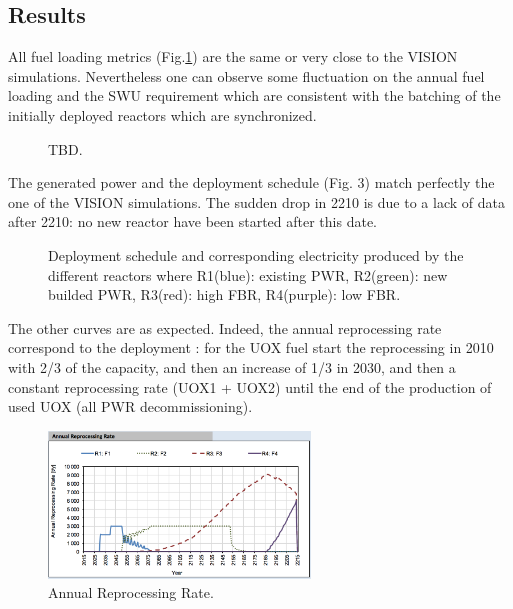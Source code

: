 \documentclass[12pt]{article}
\begin{document}
\subsection{Results}
All fuel loading metrics (Fig.\ref{fig:RessourceUsed}) are the same or very close to the VISION simulations. Nevertheless one can observe some fluctuation on the annual fuel loading and the SWU requirement which are consistent with the batching of the initially deployed reactors which are synchronized.

\begin{figure}[h!]
\centering
{}
\caption{TBD.\label{fig:RessourceUsed} }
\end{figure}

The generated power and the deployment schedule (Fig. 3)  match perfectly the one of the VISION simulations. The sudden drop in 2210 is due to a lack of data after 2210: no new reactor have been started after this date.\\

\begin{figure}[h!]
\centering
{}
\caption{Deployment schedule and corresponding electricity produced by the different reactors where
R1(blue): existing PWR, R2(green): new builded PWR, R3(red): high FBR, R4(purple): low FBR.\label{fig:deployment_bis} }
\end{figure}


The other curves are as expected. Indeed, the annual reprocessing rate correspond to the deployment :  for the UOX fuel start the reprocessing in 2010 with 2/3 of the capacity, and then an increase of 1/3 in 2030, and then a constant reprocessing rate (UOX1 + UOX2) until the end of the production of used UOX (all PWR decommissioning).


\begin{figure}[h!]
\centering
\includegraphics[width=0.62\textwidth]	{img/AnnualReprocessingRate_1}
\caption{Annual Reprocessing Rate.}
\label{fig:reprocessing_1}
\end{figure}
\end{document}
